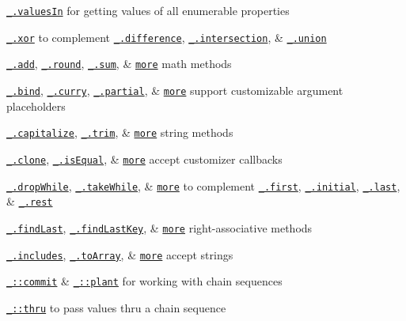 \begin{DoxyItemize}
\item \href{https://lodash.com/docs#valuesIn}{\tt \+\_\+.\+values\+In} for getting values of all enumerable properties
\item \href{https://lodash.com/docs#xor}{\tt \+\_\+.\+xor} to complement \href{https://lodash.com/docs#difference}{\tt \+\_\+.\+difference}, \href{https://lodash.com/docs#intersection}{\tt \+\_\+.\+intersection}, \& \href{https://lodash.com/docs#union}{\tt \+\_\+.\+union}
\item \href{https://lodash.com/docs#add}{\tt \+\_\+.\+add}, \href{https://lodash.com/docs#round}{\tt \+\_\+.\+round}, \href{https://lodash.com/docs#sum}{\tt \+\_\+.\+sum}, \& \href{https://lodash.com/docs}{\tt more} math methods
\item \href{https://lodash.com/docs#bind}{\tt \+\_\+.\+bind}, \href{https://lodash.com/docs#curry}{\tt \+\_\+.\+curry}, \href{https://lodash.com/docs#partial}{\tt \+\_\+.\+partial}, \& \href{https://lodash.com/docs}{\tt more} support customizable argument placeholders
\item \href{https://lodash.com/docs#capitalize}{\tt \+\_\+.\+capitalize}, \href{https://lodash.com/docs#trim}{\tt \+\_\+.\+trim}, \& \href{https://lodash.com/docs}{\tt more} string methods
\item \href{https://lodash.com/docs#clone}{\tt \+\_\+.\+clone}, \href{https://lodash.com/docs#isEqual}{\tt \+\_\+.\+is\+Equal}, \& \href{https://lodash.com/docs}{\tt more} accept customizer callbacks
\item \href{https://lodash.com/docs#dropWhile}{\tt \+\_\+.\+drop\+While}, \href{https://lodash.com/docs#takeWhile}{\tt \+\_\+.\+take\+While}, \& \href{https://lodash.com/docs}{\tt more} to complement \href{https://lodash.com/docs#first}{\tt \+\_\+.\+first}, \href{https://lodash.com/docs#initial}{\tt \+\_\+.\+initial}, \href{https://lodash.com/docs#last}{\tt \+\_\+.\+last}, \& \href{https://lodash.com/docs#rest}{\tt \+\_\+.\+rest}
\item \href{https://lodash.com/docs#findLast}{\tt \+\_\+.\+find\+Last}, \href{https://lodash.com/docs#findLastKey}{\tt \+\_\+.\+find\+Last\+Key}, \& \href{https://lodash.com/docs}{\tt more} right-\/associative methods
\item \href{https://lodash.com/docs#includes}{\tt \+\_\+.\+includes}, \href{https://lodash.com/docs#toArray}{\tt \+\_\+.\+to\+Array}, \& \href{https://lodash.com/docs}{\tt more} accept strings
\item \href{https://lodash.com/docs#prototype-commit}{\tt \+\_\+\+::commit} \& \href{https://lodash.com/docs#prototype-plant}{\tt \+\_\+\+::plant} for working with chain sequences
\item \href{https://lodash.com/docs#thru}{\tt \+\_\+\+::thru} to pass values thru a chain sequence
\end{DoxyItemize}

